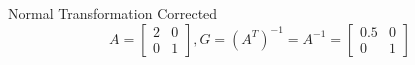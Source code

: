 \documentclass{beamer}
\begin{document}
\begin{frame}{Normal Transformation Corrected}
\[ A = \left[ \begin{array}{cc} 2 & 0\\ 0 & 1\end{array} \right], G = (A^T)^{-1} = A^{-1} = \left[ \begin{array}{cc} 0.5 & 0\\ 0 & 1 \end{array} \right] \]

\begin{figure}[t]
    \captionsetup[subfloat]{labelformat=empty}
	\centering
\end{figure}

\end{frame}
\end{document}
